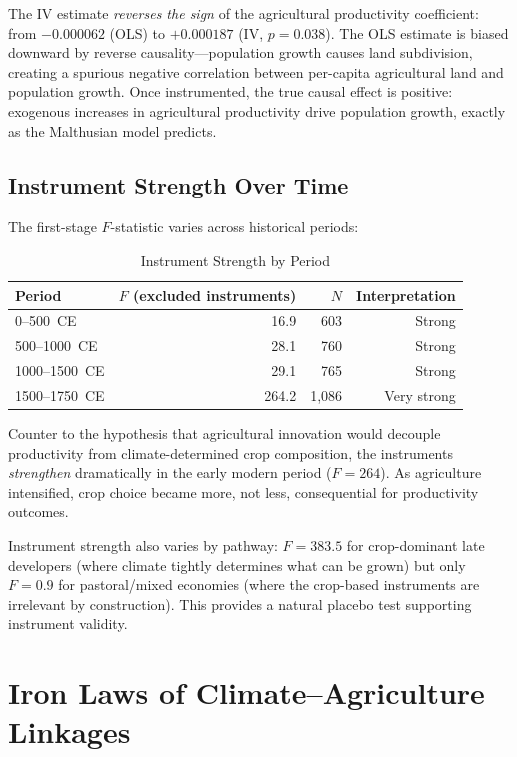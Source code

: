 \documentclass[12pt,letterpaper]{article}
\begin{document}
The IV estimate \textit{reverses the sign} of the agricultural productivity coefficient: from $-0.000062$ (OLS) to $+0.000187$ (IV, $p = 0.038$). The OLS estimate is biased downward by reverse causality---population growth causes land subdivision, creating a spurious negative correlation between per-capita agricultural land and population growth. Once instrumented, the true causal effect is positive: exogenous increases in agricultural productivity drive population growth, exactly as the Malthusian model predicts.

\subsection{Instrument Strength Over Time}

The first-stage $F$-statistic varies across historical periods:

\begin{table}[H]
\centering
\caption{Instrument Strength by Period}
\label{tab:f_by_period}
\small
\begin{tabular}{lrrr}
\toprule
Period & $F$ (excluded instruments) & $N$ & Interpretation \\
\midrule
0--500~CE & 16.9 & 603 & Strong \\
500--1000~CE & 28.1 & 760 & Strong \\
1000--1500~CE & 29.1 & 765 & Strong \\
1500--1750~CE & 264.2 & 1,086 & Very strong \\
\bottomrule
\end{tabular}
\end{table}

Counter to the hypothesis that agricultural innovation would decouple productivity from climate-determined crop composition, the instruments \textit{strengthen} dramatically in the early modern period ($F = 264$). As agriculture intensified, crop choice became more, not less, consequential for productivity outcomes.

Instrument strength also varies by pathway: $F = 383.5$ for crop-dominant late developers (where climate tightly determines what can be grown) but only $F = 0.9$ for pastoral/mixed economies (where the crop-based instruments are irrelevant by construction). This provides a natural placebo test supporting instrument validity.

\section{Iron Laws of Climate--Agriculture Linkages}
\label{sec:iron_laws}
\end{document}
